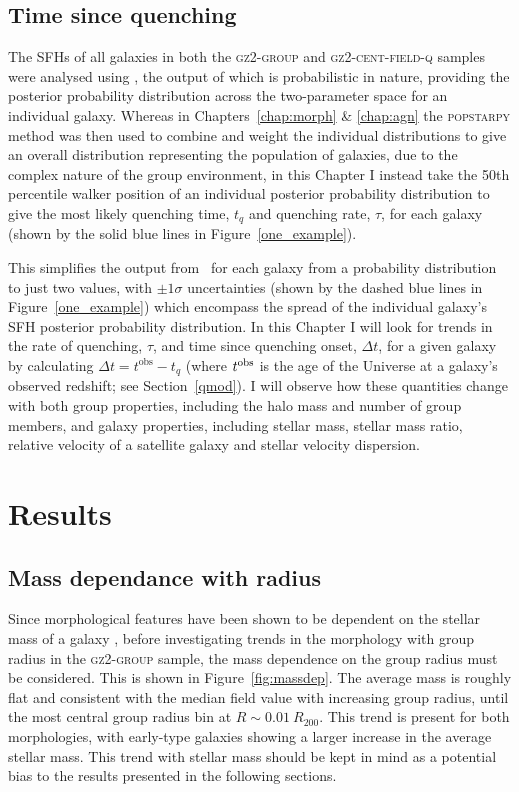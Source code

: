 \subsection{Time since quenching}\label{sec:delta}

The SFHs of all galaxies in both the \textsc{gz2-group} and \textsc{gz2-cent-field-q} samples were analysed using \starpy, the output of which is probabilistic in nature, providing the posterior probability distribution across the two-parameter space for an individual galaxy. Whereas in Chapters~\ref{chap:morph} \& \ref{chap:agn} the \textsc{popstarpy} method was then used to combine and weight the individual distributions to give an overall distribution representing the population of galaxies, due to the complex nature of the group environment, in this Chapter I instead take the 50th percentile walker position of an individual posterior probability distribution to give the most likely quenching time, $t_{q}$ and quenching rate, $\tau$, for each galaxy (shown by the solid blue lines in Figure~\ref{one_example}).

This simplifies the output from \starpy\ for each galaxy from a probability distribution to just two values, with $\pm1\sigma$ uncertainties (shown by the dashed blue lines in Figure~\ref{one_example}) which encompass the spread of the individual galaxy's SFH posterior probability distribution. In this Chapter I will look for trends in the rate of quenching, $\tau$, and time since quenching onset, $\Delta t$, for a given galaxy by calculating {\bf $\Delta t = t^\mathrm{obs} - t_{q}$} (where $t^{\rm{obs}}$ is the age of the Universe at a galaxy's observed redshift; see Section~\ref{qmod}). I will observe how these quantities change with both group properties, including the halo mass and number of group members, and galaxy properties, including stellar mass, stellar mass ratio, relative velocity of a satellite galaxy and stellar velocity dispersion. 


\section{Results}\label{sec:results}

\subsection{Mass dependance with radius}

Since morphological features have been shown to be dependent on the stellar mass of a galaxy \citep[e.g. the increase in the bar fraction with stellar mass; see][]{nair10, skibba12}, before investigating trends in the morphology with group radius in the \textsc{gz2-group} sample, the mass dependence on the group radius must be considered. This is shown in Figure~\ref{fig:massdep}. The average mass is roughly flat and consistent with the median field value with increasing group radius, until the most central group radius bin at $R \sim 0.01~R_{200}$. This trend is present for both morphologies, with early-type galaxies showing a larger increase in the average stellar mass. This trend with stellar mass should be kept in mind as a potential bias to the results presented in the following sections. 

